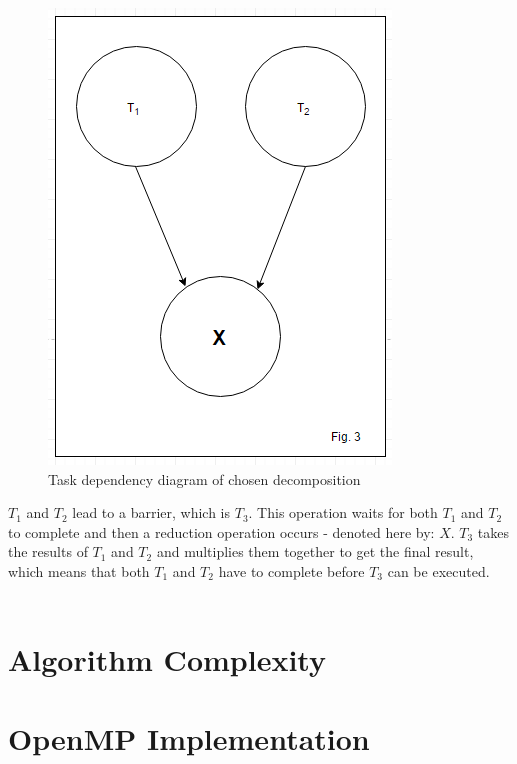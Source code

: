 \documentclass[11pt]{article}
\begin{document}
\begin{page}
\begin{figure}
\centering
     \includegraphics[scale=0.75]{parallel_fig3}\\
     Task dependency diagram of chosen decomposition
\end{figure}
\noindent $T_1$ and $T_2$ lead to a barrier, which is $T_3$. This operation waits for both $T_1$ and $T_2$ to complete and then a reduction operation occurs - denoted here by: $X$. $T_3$ takes the results of $T_1$ and $T_2$ and multiplies them together to get the final result, which means that both $T_1$ and $T_2$ have to complete before $T_3$ can be executed.\\\\


\section{Algorithm Complexity}



\section{OpenMP Implementation}



\end{page}
\end{document}
